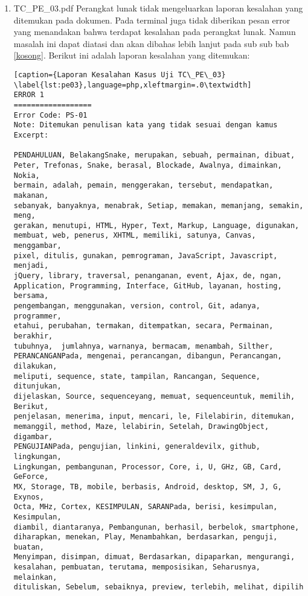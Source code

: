 \begin{enumerate}
	\item TC\_PE\_03.pdf \newline
	Perangkat lunak tidak mengeluarkan laporan kesalahan yang ditemukan pada dokumen. Pada terminal juga tidak diberikan pesan error yang menandakan bahwa terdapat kesalahan pada perangkat lunak. Namun masalah ini dapat diatasi dan akan dibahas lebih lanjut pada sub sub bab \ref{kosong}. Berikut ini adalah laporan kesalahan yang ditemukan:

\begin{lstlisting}[caption={Laporan Kesalahan Kasus Uji TC\_PE\_03}	\label{lst:pe03},language=php,xleftmargin=.0\textwidth]
ERROR 1
==================
Error Code: PS-01
Note: Ditemukan penulisan kata yang tidak sesuai dengan kamus
Excerpt: 

PENDAHULUAN, BelakangSnake, merupakan, sebuah, permainan, dibuat, 
Peter, Trefonas, Snake, berasal, Blockade, Awalnya, dimainkan, Nokia, 
bermain, adalah, pemain, menggerakan, tersebut, mendapatkan, makanan, 
sebanyak, banyaknya, menabrak, Setiap, memakan, memanjang, semakin, meng, 
gerakan, menutupi, HTML, Hyper, Text, Markup, Language, digunakan, 
membuat, web, penerus, XHTML, memiliki, satunya, Canvas, menggambar, 
pixel, ditulis, gunakan, pemrograman, JavaScript, Javascript, menjadi, 
jQuery, library, traversal, penanganan, event, Ajax, de, ngan, 
Application, Programming, Interface, GitHub, layanan, hosting, bersama, 
pengembangan, menggunakan, version, control, Git, adanya, programmer, 
etahui, perubahan, termakan, ditempatkan, secara, Permainan, berakhir, 
tubuhnya,  jumlahnya, warnanya, bermacam, menambah, Silther, 
PERANCANGANPada, mengenai, perancangan, dibangun, Perancangan, dilakukan, 
meliputi, sequence, state, tampilan, Rancangan, Sequence, ditunjukan, 
dijelaskan, Source, sequenceyang, memuat, sequenceuntuk, memilih, Berikut, 
penjelasan, menerima, input, mencari, le, Filelabirin, ditemukan, 
memanggil, method, Maze, lelabirin, Setelah, DrawingObject, digambar, 
PENGUJIANPada, pengujian, linkini, generaldevilx, github, lingkungan, 
Lingkungan, pembangunan, Processor, Core, i, U, GHz, GB, Card, GeForce, 
MX, Storage, TB, mobile, berbasis, Android, desktop, SM, J, G, Exynos, 
Octa, MHz, Cortex, KESIMPULAN, SARANPada, berisi, kesimpulan, Kesimpulan, 
diambil, diantaranya, Pembangunan, berhasil, berbelok, smartphone, 
diharapkan, menekan, Play, Menambahkan, berdasarkan, penguji, buatan, 
Menyimpan, disimpan, dimuat, Berdasarkan, dipaparkan, mengurangi, 
kesalahan, pembuatan, terutama, memposisikan, Seharusnya, melainkan, 
dituliskan, Sebelum, sebaiknya, preview, terlebih, melihat, dipilih


\end{lstlisting}
\end{enumerate}
